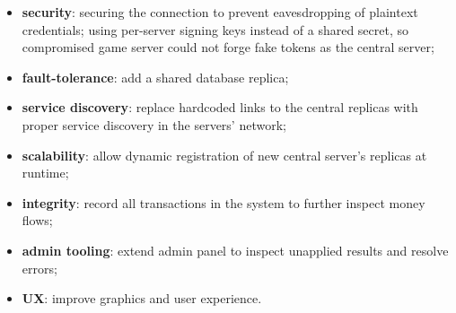 \documentclass{scrartcl}
\begin{document}
\begin{itemize}
  \item \textbf{security}: securing the connection to prevent eavesdropping of plaintext credentials; using per-server signing keys instead of a shared secret, so compromised game server could not forge fake tokens as the central server;
  \item \textbf{fault-tolerance}: add a shared database replica;
  \item \textbf{service discovery}: replace hardcoded links to the central replicas with proper service discovery in the servers' network;
  \item \textbf{scalability}: allow dynamic registration of new central server's replicas at runtime;
  \item \textbf{integrity}: record all transactions in the system to further inspect money flows;
  \item \textbf{admin tooling}: extend admin panel to inspect unapplied results and resolve errors;
  \item \textbf{UX}: improve graphics and user experience.
\end{itemize}




\end{document}
